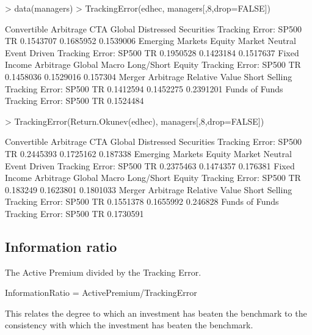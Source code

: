 \documentclass[12pt,letterpaper,english]{article}
\begin{document}
\begin{Schunk}
\begin{Sinput}
> data(managers)
> TrackingError(edhec, managers[,8,drop=FALSE]) 
\end{Sinput}
\begin{Soutput}
                         Convertible Arbitrage CTA Global Distressed Securities
Tracking Error: SP500 TR             0.1543707  0.1685952             0.1539006
                         Emerging Markets Equity Market Neutral Event Driven
Tracking Error: SP500 TR        0.1950528             0.1423184    0.1517637
                         Fixed Income Arbitrage Global Macro Long/Short Equity
Tracking Error: SP500 TR              0.1458036    0.1529016          0.157304
                         Merger Arbitrage Relative Value Short Selling
Tracking Error: SP500 TR        0.1412594      0.1452275     0.2391201
                         Funds of Funds
Tracking Error: SP500 TR      0.1524484
\end{Soutput}
\begin{Sinput}
> TrackingError(Return.Okunev(edhec), managers[,8,drop=FALSE]) 
\end{Sinput}
\begin{Soutput}
                         Convertible Arbitrage CTA Global Distressed Securities
Tracking Error: SP500 TR             0.2445393  0.1725162              0.187338
                         Emerging Markets Equity Market Neutral Event Driven
Tracking Error: SP500 TR        0.2375463             0.1474357     0.176381
                         Fixed Income Arbitrage Global Macro Long/Short Equity
Tracking Error: SP500 TR               0.183249    0.1623801         0.1801033
                         Merger Arbitrage Relative Value Short Selling
Tracking Error: SP500 TR        0.1551378      0.1655992      0.246828
                         Funds of Funds
Tracking Error: SP500 TR      0.1730591
\end{Soutput}
\end{Schunk}

\subsection{Information ratio }

The Active Premium divided by the Tracking Error.
 
InformationRatio = ActivePremium/TrackingError
 
This relates the degree to which an investment has beaten the benchmark to the consistency with which the investment has beaten the benchmark.
\end{document}
